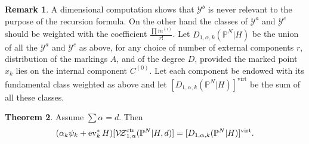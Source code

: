 \documentclass[11pt]{amsart}
\newcommand{\PP}{\mathbb P}
\newcommand{\VZc}[4]{\mathcal{V\!Z}^{\rm{ctr}}_{#1,#2}(#3,#4)}
\newcommand{\virt}[1]{[#1]^{\operatorname{virt}}}
\newcommand{\ev}{\operatorname{ev}}
\theoremstyle{definition}
\newtheorem{thm}{Theorem}[section]
\theoremstyle{definition}
\newtheorem{remark}[thm]{Remark}
\begin{document}
\begin{remark}
 A dimensional computation shows that $\mathcal Y^b$ is never relevant to the purpose of the recursion formula. On the other hand the classes of $\mathcal Y^a$ and $\mathcal Y^c$ should be weighted with the coefficient $\frac{\prod m^{(i)}}{r!}$. Let $D_{1,\alpha,k}(\PP^N|H)$ be the union of all the $\mathcal Y^a$ and $\mathcal Y^c$ as above, for any choice of number of external components $r$, distribution of the markings $A$, and of the degree $D$, provided the marked point $x_k$ lies on the internal component $C^{(0)}$. Let each component be endowed with its fundamental class weighted as above and let $\virt{D_{1,\alpha,k}(\PP^N|H)}$ be the sum of all these classes.
\end{remark}

\begin{thm}
 Assume $\sum\alpha=d$. Then \[(\alpha_k\psi_k+\ev_k^*H)[\VZc{1}{\alpha}{\PP^N|H}{d}]=\virt{D_{1,\alpha,k}(\PP^N|H)}.\]
\end{thm}
\end{document}
